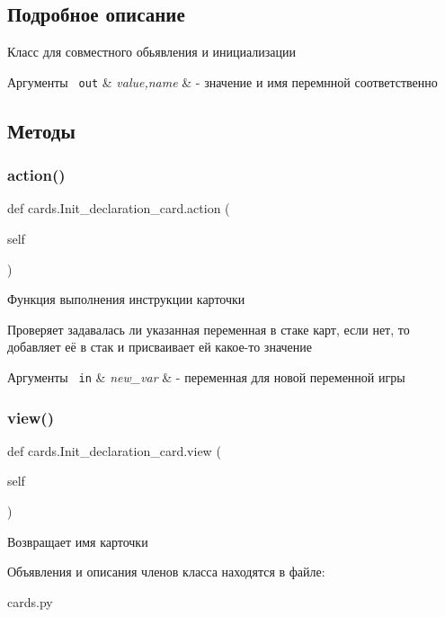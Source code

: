 \subsection{Подробное описание}
Класс для совместного обьявления и инициализации 


\begin{DoxyParams}[1]{Аргументы}
\mbox{\texttt{ out}}  & {\em value,name} & -\/ значение и имя перемнной соответственно \\
\hline
\end{DoxyParams}


\subsection{Методы}
\mbox{\label{classcards_1_1_init__declaration__card_ac2bf0e8cdc091e7634e965c68772727c}} 
\subsubsection{\texorpdfstring{action()}{action()}}
{\footnotesize\ttfamily def cards.\+Init\+\_\+declaration\+\_\+card.\+action (\begin{DoxyParamCaption}\item[{}]{self }\end{DoxyParamCaption})}



Функция выполнения инструкции карточки 

Проверяет задавалась ли указанная переменная в стаке карт, если нет, то добавляет её в стак и присваивает ей какое-\/то значение 
\begin{DoxyParams}[1]{Аргументы}
\mbox{\texttt{ in}}  & {\em new\+\_\+var} & -\/ переменная для новой переменной игры \\
\hline
\end{DoxyParams}
\mbox{\label{classcards_1_1_init__declaration__card_a5bc4b4fe857cd05102f6f0c287d6a8b8}} 
\subsubsection{\texorpdfstring{view()}{view()}}
{\footnotesize\ttfamily def cards.\+Init\+\_\+declaration\+\_\+card.\+view (\begin{DoxyParamCaption}\item[{}]{self }\end{DoxyParamCaption})}



Возвращает имя карточки 



Объявления и описания членов класса находятся в файле\+:\begin{DoxyCompactItemize}
\item 
cards.\+py\end{DoxyCompactItemize}
